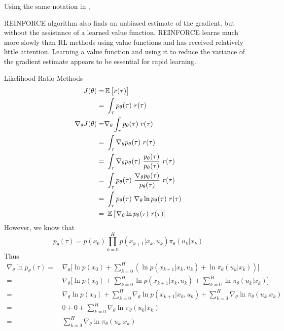 \documentclass[9pt]{article}
\begin{document}
Using the same notation in , 

 \Working

 REINFORCE algorithm also finds an unbiased estimate of
the gradient, but without the assistance of a learned value function. REINFORCE
learns much more slowly than RL methods using value functions and has received
relatively little attention. Learning a value function and using it to reduce the variance
of the gradient estimate appears to be essential for rapid learning.

Likelihood Ratio Methods
\[
\begin{split}
	J(\theta) = & \E \big[r(\tau)\big] \\
	= &\ \int_{\tau} p_{\theta}(\tau)\ r(\tau)\\
	\nabla_{\theta} J(\theta) = & \nabla_{\theta} \int_{\tau} p_{\theta}(\tau)\ r(\tau)\\
	= &\ \int_{\tau} \nabla_{\theta} p_{\theta}(\tau)\ r(\tau)\\
	= &\ \int_{\tau} \nabla_{\theta} p_{\theta}(\tau)\ \frac{p_{\theta}(\tau)}{p_{\theta}(\tau)}\ r(\tau)\\
	= &\ \int_{\tau} p_{\theta}(\tau)\ \frac{\nabla_{\theta} p_{\theta}(\tau)}{p_{\theta}(\tau)}\ r(\tau)\\
	= &\ \int_{\tau} p_{\theta}(\tau)\ \nabla_{\theta} \ln p_{\theta}(\tau)\ r(\tau)\\
	= &\ \E \big[ \nabla_{\theta} \ln p_{\theta}(\tau)\ r(\tau) \big]
\end{split}
\]
However, we know that
\[
p_{\theta}(\tau) = p(x_0) \prod_{k=0}^{H}p(x_{k+1}|x_k,u_k)\pi_{\theta}(u_k|x_k)
\]
Thus
\[
\begin{split}
\nabla_{\theta} \ln p_{\theta}(\tau) = &\ \nabla_{\theta} \big[ \ln p(x_0) + \sum_{k=0}^{H} (\ln p(x_{k+1}|x_k,u_k) + \ln \pi_{\theta}(u_k|x_k))\big]\\
= &\ \nabla_{\theta} \big[ \ln p(x_0) + \sum_{k=0}^{H} \ln p(x_{k+1}|x_k,u_k) + \sum_{k=0}^{H} \ln \pi_{\theta}(u_k|x_k)\big]\\
= &\ \nabla_{\theta} \ln p(x_0) + \sum_{k=0}^{H} \nabla_{\theta} \ln p(x_{k+1}|x_k,u_k) + \sum_{k=0}^{H} \nabla_{\theta} \ln \pi_{\theta}(u_k|x_k)\\
= &\ 0 + 0 + \sum_{k=0}^{H} \nabla_{\theta} \ln \pi_{\theta}(u_k|x_k)\\
= &\ \sum_{k=0}^{H} \nabla_{\theta} \ln \pi_{\theta}(u_k|x_k)\\
\end{split}
\]
\end{document}
